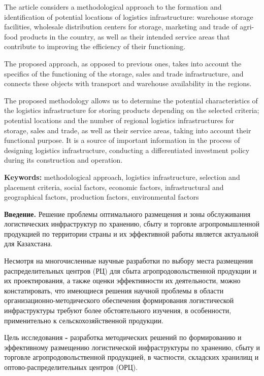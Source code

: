 The article considers a methodological approach to the formation and
identification of potential locations of logistics infrastructure:
warehouse storage facilities, wholesale distribution centers for
storage, marketing and trade of agri-food products in the country, as
well as their intended service areas that contribute to improving the
efficiency of their functioning.

The proposed approach, as opposed to previous ones, takes into account
the specifics of the functioning of the storage, sales and trade
infrastructure, and connects these objects with transport and warehouse
availability in the regions.

The proposed methodology allows us to determine the potential
characteristics of the logistics infrastructure for storing products
depending on the selected criteria; potential locations and the number
of regional logistics infrastructures for storage, sales and trade, as
well as their service areas, taking into account their functional
purpose. It is a source of important information in the process of
designing logistics infrastructure, conducting a differentiated
investment policy during its construction and operation.

{\bfseries Keywords:} methodological approach, logistics infrastructure,
selection and placement criteria, social factors, economic factors,
infrastructural and geographical factors, production factors,
environmental factors

{\bfseries Введение.} Решение проблемы оптимального размещения и зоны
обслуживания логистических инфраструктур по хранению, сбыту и торговле
агропромышленной продукцией по территории страны и их эффективной работы
является актуальной для Казахстана.

Несмотря на многочисленные научные разработки по выбору места размещения
распределительных центров (РЦ) для сбыта агропродовольственной продукции
и их проектирования, а также оценки эффективности их деятельности, можно
констатировать, что имеющиеся решения научной проблемы в области
организационно-методического обеспечения формирования логистической
инфраструктуры требуют более обстоятельного изучения, в особенности,
применительно к сельскохозяйственной продукции.

Цель исследования {\bfseries -} разработка методических решений по
формированию и эффективному размещению логистической инфраструктуры по
хранению, сбыту и торговле агропродовольственной продукцией, в
частности, складских хранилищ и оптово-распределительных центров (ОРЦ).

